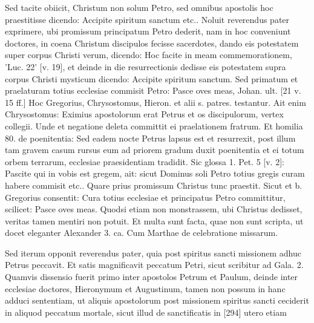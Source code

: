 Sed tacite obiicit, Christum non solum Petro, sed omnibus apostolis hoc praestitisse dicendo: Accipite spiritum sanctum etc.. Noluit reverendus pater exprimere, ubi promissum principatum Petro dederit, nam in hoc conveniunt doctores, in coena Christum discipulos fecisse sacerdotes, dando eis potestatem super corpus Christi verum, dicendo: Hoc facite in meam commemorationem, 'Luc. 22' [v. 19], et deinde in die resurrectionis dedisse eis potestatem supra corpus Christi mysticum dicendo: Accipite spiritum sanctum. Sed primatum et praelaturam totius ecclesiae commisit Petro: Pasce oves meas, Johan. ult. [21 v. 15 ff.] Hoc Gregorius, Chrysostomus, Hieron. et alii s. patres. testantur. Ait enim Chrysostomus: Eximius apostolorum erat Petrus et os discipulorum, vertex collegii. Unde et negatione deleta committit ei praelationem fratrum. Et homilia 80. de poenitentia: Sed eadem nocte Petrus lapsus est et resurrexit, post illum tam gravem casum rursus eum ad priorem gradum duxit poenitentia et ei totum orbem terrarum, ecclesiae praesidentiam tradidit. Sic glossa 1. Pet. 5 [v. 2]: Pascite qui in vobis est gregem, ait: sicut Dominus soli Petro totius gregis curam habere commisit etc.. Quare prius promissum Christus tunc praestit. Sicut et b. Gregorius consentit: Cura totius ecclesiae et principatus Petro committitur, scilicet: Pasce oves meas. Quodsi etiam non monstrassem, ubi Christus dedisset, veritas tamen mentiri non potuit. Et multa sunt facta, quae non sunt scripta, ut docet eleganter Alexander 3. ca. Cum Marthae de celebratione missarum.

Sed iterum opponit reverendus pater, quia post spiritus sancti missionem adhuc Petrus peccavit. Et satis magnificavit peccatum Petri, sicut scribitur ad Gala. 2. Quamvis dissensio fuerit primo inter apostolos Petrum et Paulum, deinde inter ecclesiae doctores, Hieronymum et Augustinum, tamen non possum in hanc adduci sententiam, ut aliquis apostolorum post missionem spiritus sancti ceciderit in aliquod peccatum mortale, sicut illud de sanctificatis in [294] utero etiam

